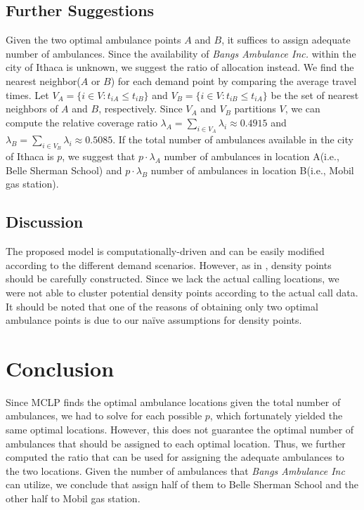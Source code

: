 \documentclass{article}
\begin{document}
\subsection{Further Suggestions}
Given the two optimal ambulance points $A$ and $B$, it suffices to assign adequate number of ambulances. Since the availability of \textit{Bangs Ambulance Inc.} within the city of Ithaca is unknown, we suggest the ratio of allocation instead. We find the nearest neighbor($A$ or $B$) for each demand point by comparing the average travel times. Let $V_A = \{i \in V : t_{iA} \leq t_{iB}\}$ and $V_B = \{i \in V : t_{iB} \leq t_{iA}\}$ be the set of nearest neighbors of $A$ and $B$, respectively. Since $V_A$ and $V_B$ partitions $V$, we can compute the relative coverage ratio $\lambda_A = \sum_{i \in V_A} \lambda_i \approx 0.4915$ and $\lambda_B = \sum_{i \in V_B} \lambda_i \approx 0.5085$. If the total number of ambulances available in the city of Ithaca is $p$, we suggest that $p \cdot \lambda_A$ number of ambulances in location A(i.e., Belle Sherman School) and $p \cdot \lambda_B$ number of ambulances in location B(i.e., Mobil gas station).
\subsection{Discussion}
The proposed model is computationally-driven and can be easily modified according to the different demand scenarios. However, as in \cite{DIBENE2017107} , density points should be carefully constructed. Since we lack the actual calling locations, we were not able to cluster potential density points according to the actual call data. It should be noted that one of the reasons of obtaining only two optimal ambulance points is due to our na\"ive assumptions for density points.

\section{Conclusion}
Since MCLP finds the optimal ambulance locations given the total number of ambulances, we had to solve for each possible $p$, which fortunately yielded the same optimal locations. However, this does not guarantee the optimal number of ambulances that should be assigned to each optimal location. Thus, we further computed the ratio that can be used for assigning the adequate ambulances to the two locations. Given the number of ambulances that \textit{Bangs Ambulance Inc} can utilize, we conclude that assign half of them to Belle Sherman School and the other half to Mobil gas station.
\end{document}
